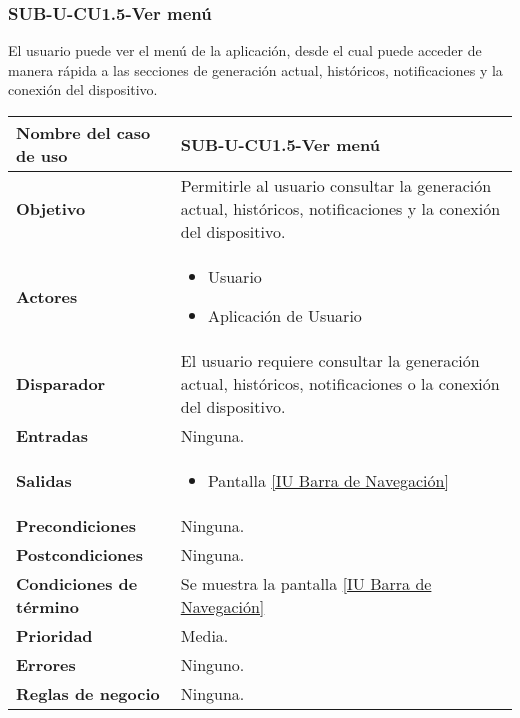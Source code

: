 \subsubsection{SUB-U-CU1.5-Ver menú}\label{SUB-U-CU1.5}
El usuario puede ver el menú de la aplicación, desde el cual puede acceder de manera rápida a las secciones de generación actual, históricos, notificaciones y la conexión del dispositivo.
\begin{longtable}{|J{5cm}|J{10.3cm}|}
	\hline
	\textbf{Nombre del caso de uso} &
		SUB-U-CU1.5-Ver menú \\ \hline
	\textbf{Objetivo} &
		Permitirle al usuario consultar la generación actual, históricos, notificaciones y la conexión del dispositivo. \\ \hline
	\textbf{Actores} &
	    \begin{itemize}
		    \item Usuario
		    \item Aplicación de Usuario
		\end{itemize}\\ \hline
	\textbf{Disparador} & 
		El usuario requiere consultar la generación actual, históricos, notificaciones o la conexión del dispositivo.\\ \hline 
	\textbf{Entradas} & Ninguna.
		\\ \hline 
	\textbf{Salidas} & 
		\begin{itemize}
			\item Pantalla \hyperref[fig:Barra de navegacion]{[IU Barra de Navegación]} 
		\end{itemize} \\ \hline
	\textbf{Precondiciones} &
		Ninguna.\\ \hline
	\textbf{Postcondiciones} & Ninguna.
		\\ \hline
	\textbf{Condiciones de término} & Se muestra la pantalla \hyperref[fig:Barra de navegacion]{[IU Barra de Navegación]} 
		\\ \hline 
	\textbf{Prioridad} & 
		Media. \\ \hline
	\textbf{Errores} & Ninguno.
		\\ \hline
	\textbf{Reglas de negocio} & Ninguna.
		 \\ \hline
\end{longtable}


